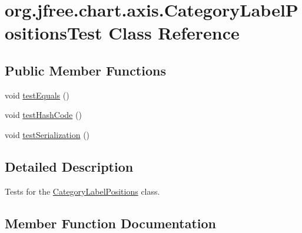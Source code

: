\hypertarget{classorg_1_1jfree_1_1chart_1_1axis_1_1_category_label_positions_test}{}\section{org.\+jfree.\+chart.\+axis.\+Category\+Label\+Positions\+Test Class Reference}
\label{classorg_1_1jfree_1_1chart_1_1axis_1_1_category_label_positions_test}
\subsection*{Public Member Functions}
\begin{DoxyCompactItemize}
\item 
void \mbox{\hyperlink{classorg_1_1jfree_1_1chart_1_1axis_1_1_category_label_positions_test_a31f371b694c48c8dd53344e7e6d1f8b3}{test\+Equals}} ()
\item 
void \mbox{\hyperlink{classorg_1_1jfree_1_1chart_1_1axis_1_1_category_label_positions_test_a259e7dbffa71398b024a838a24c38f80}{test\+Hash\+Code}} ()
\item 
void \mbox{\hyperlink{classorg_1_1jfree_1_1chart_1_1axis_1_1_category_label_positions_test_a32dbf20e69d94e68e5a8cc12edbf68fd}{test\+Serialization}} ()
\end{DoxyCompactItemize}


\subsection{Detailed Description}
Tests for the \mbox{\hyperlink{classorg_1_1jfree_1_1chart_1_1axis_1_1_category_label_positions}{Category\+Label\+Positions}} class. 

\subsection{Member Function Documentation}
\mbox{\label{classorg_1_1jfree_1_1chart_1_1axis_1_1_category_label_positions_test_a31f371b694c48c8dd53344e7e6d1f8b3}} 
